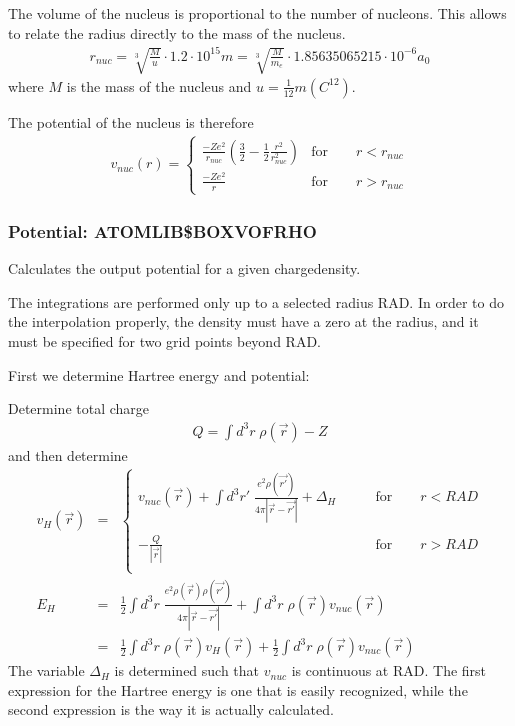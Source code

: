 \documentclass[11pt,a4paper]{report}
\begin{document}
The
volume of the nucleus is proportional to the number of nucleons.  This
allows to relate the radius directly to the mass of the nucleus.\cite{cooper53_pr92_801,hofstadter56_rmp28_214}
\begin{eqnarray*}
r_{nuc}=\sqrt[3]{\frac{M}{u}}\cdot1.2\cdot 10^{15} m 
=\sqrt[3]{\frac{M}{m_e}}\cdot1.85635065215\cdot 10^{-6}  a_0
\end{eqnarray*}
where $M$ is the mass of the nucleus and
$u=\frac{1}{12}m(C^{12})$. 

The potential of the nucleus is therefore
\begin{eqnarray*}
v_{nuc}(r)=
\left\lbrace
\begin{array}{cc}
\frac{-Ze^2}{r_{nuc}}\left(\frac{3}{2}-\frac{1}{2}\frac{r^2}{r_{nuc}^2}\right)
&\textrm{for}\qquad r<r_{nuc}\\
\frac{-Ze^2}{r}
&\textrm{for}\qquad r>r_{nuc}
\end{array}\right.
\end{eqnarray*}

\subsubsection{Potential: ATOMLIB\$BOXVOFRHO}
Calculates the output potential for a given chargedensity. 

The integrations are performed only up to a selected radius RAD. In
order to do the interpolation properly, the density must have a zero
at the radius, and it must be specified for two grid points beyond
RAD.


First we determine Hartree energy and potential:

Determine total charge
\begin{eqnarray*}
Q=\int d^3r\;\rho(\vec{r})-Z
\end{eqnarray*}
and then determine 
\begin{eqnarray*}
v_H(\vec{r})&=&\left\lbrace
\begin{array}{ll}
v_{nuc}(\vec{r})+\int d^3r'\;
\frac{e^2\rho(\vec{r'})}{4\pi|\vec{r}-\vec{r'}|}
+\Delta_H &\qquad\text{for}\qquad r<RAD\\
\\
-\frac{Q}{|\vec{r}|} &\qquad\text{for}\qquad r>RAD\\
\end{array}\right.
\\
E_H&=&
\frac{1}{2}\int d^3r\; \frac{e^2\rho(\vec{r})\rho(\vec{r'})}
{4\pi|\vec{r}-\vec{r'}|}
+\int d^3r\; \rho(\vec{r})v_{nuc}(\vec{r})
\\
&=& \frac{1}{2}\int d^3r\; \rho(\vec{r})v_{H}(\vec{r})
+\frac{1}{2}\int d^3r\; \rho(\vec{r})v_{nuc}(\vec{r})
\end{eqnarray*}
The variable $\Delta_H$ is determined such that $v_{nuc}$ is
continuous at RAD. The first expression for the Hartree energy is one
that is easily recognized, while the second expression is the way it
is actually calculated.
\end{document}
